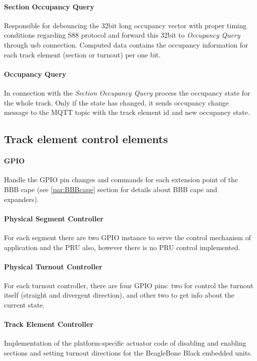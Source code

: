 \paragraph{Section Occupancy Query}
Responsible for debouncing the 32bit long occupancy vector with proper timing conditions regarding S88 protocol and forward this 32bit to \textit{Occupancy Query} through usb connection. Computed data contains the occupancy information for each track element (section or turnout) per one bit.
\paragraph{Occupancy Query}
In connection with the \textit{Section Occupancy Query} process the occupancy state for the whole track. Only if the state has changed, it sends occupancy change message to the MQTT topic with the track element id and new occupancy state.

\subsection{Track element control elements}
\paragraph{GPIO}
Handle the GPIO pin changes and commands for each extension point of the BBB cape (see \ref{par:BBBcape} section for details about BBB cape and expanders).
\paragraph{Physical Segment Controller}
For each segment there are two GPIO instance to serve the control mechanism of application and the PRU also, however there is no PRU control implemented.
\paragraph{Physical Turnout Controller}
For each turnout controller, there are four GPIO pins: two for control the turnout itself (straight and divergent direction), and other two to get info about the current state.
\paragraph{Track Element Controller}
Implementation of the platform-specific actuator code of disabling and enabling sections and setting turnout directions for the BeagleBone Black embedded units.

